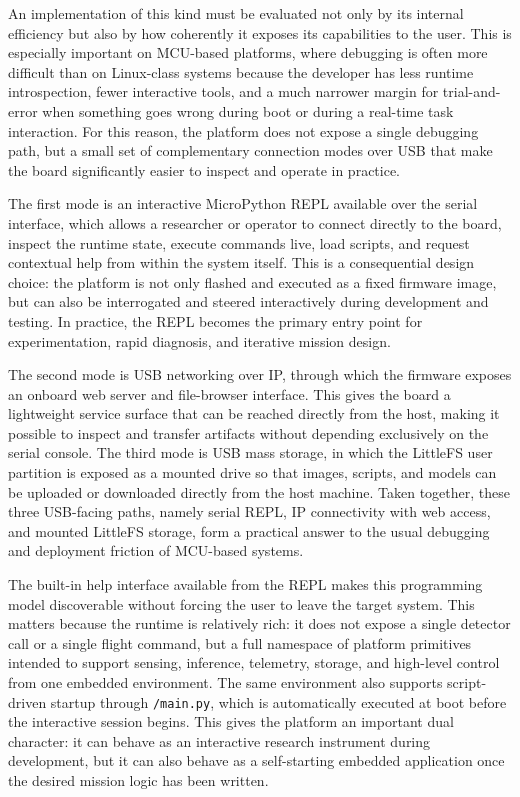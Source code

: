An implementation of this kind must be evaluated not only by its
internal efficiency but also by how coherently it exposes its
capabilities to the user. This is especially important on MCU-based
platforms, where debugging is often more difficult than on Linux-class
systems because the developer has less runtime introspection, fewer
interactive tools, and a much narrower margin for trial-and-error when
something goes wrong during boot or during a real-time task interaction.
For this reason, the platform does not expose a single debugging path,
but a small set of complementary connection modes over USB that make the
board significantly easier to inspect and operate in practice.

The first mode is an interactive MicroPython REPL available over the
serial interface, which allows a researcher or operator to connect
directly to the board, inspect the runtime state, execute commands live,
load scripts, and request contextual help from within the system itself.
This is a consequential design choice: the platform is not only flashed
and executed as a fixed firmware image, but can also be interrogated and
steered interactively during development and testing. In practice, the
REPL becomes the primary entry point for experimentation, rapid
diagnosis, and iterative mission design.

The second mode is USB networking over IP, through which the firmware
exposes an onboard web server and file-browser interface. This gives the
board a lightweight service surface that can be reached directly from
the host, making it possible to inspect and transfer artifacts without
depending exclusively on the serial console. The third mode is USB mass
storage, in which the LittleFS user partition is exposed as a mounted
drive so that images, scripts, and models can be uploaded or downloaded
directly from the host machine. Taken together, these three USB-facing
paths, namely serial REPL, IP connectivity with web access, and mounted
LittleFS storage, form a practical answer to the usual debugging and
deployment friction of MCU-based systems.

The built-in help interface available from the REPL makes this
programming model discoverable without forcing the user to leave the
target system. This matters because the runtime is relatively rich: it
does not expose a single detector call or a single flight command, but a
full namespace of platform primitives intended to support sensing,
inference, telemetry, storage, and high-level control from one embedded
environment. The same environment also supports script-driven startup
through \texttt{/main.py}, which is automatically executed at boot
before the interactive session begins. This gives the platform an
important dual character: it can behave as an interactive research
instrument during development, but it can also behave as a self-starting
embedded application once the desired mission logic has been written.

